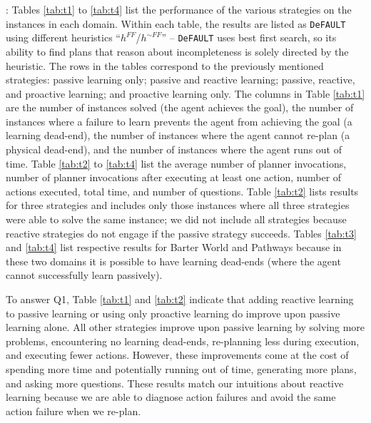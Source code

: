 \documentclass[letterpaper]{article}
\def\und#1{\noindent{\bf #1}:}
\def\FFRISKY{{\tt DeFAULT}}
\begin{document}
\und{Results} Tables \ref{tab:t1} to \ref{tab:t4} list the performance of the
various strategies on the instances in each domain.  Within each table, the
results are listed as \FFRISKY{} using different heuristics
``$h^{FF}$/$h^{\sim FF}$'' -- \FFRISKY{} uses best first search, so its
ability to find plans that reason about incompleteness is solely directed by the
heuristic. The rows in the tables correspond to the previously mentioned
strategies: passive learning only; passive and reactive learning;  passive, reactive, and proactive learning; and proactive learning only.  The columns in Table
\ref{tab:t1} are the number of instances solved (the agent achieves the goal),
the number of instances where a failure to learn prevents the agent from
achieving the goal (a learning dead-end), the number of instances where the
agent cannot re-plan (a physical dead-end), and the number of instances where
the agent runs out of time.  Table \ref{tab:t2} to \ref{tab:t4} list the average
number of planner invocations, number of planner invocations after executing at
least one action, number of actions executed, total time, and number of
questions.  Table \ref{tab:t2} lists results for three strategies and includes
only those instances where all three strategies were able to solve the same
instance; we did not include all strategies because reactive strategies do not
engage if the passive strategy succeeds. Tables \ref{tab:t3} and \ref{tab:t4}
list respective results for Barter World and Pathways because in these two domains it is possible to have learning dead-ends (where the agent cannot successfully learn passively).



To answer Q1, Table \ref{tab:t1} and \ref{tab:t2} indicate that adding reactive
learning to passive learning or using only proactive learning do improve upon
passive learning alone.  All other strategies improve upon passive learning by
solving more problems, encountering no learning dead-ends, re-planning less during
execution, and executing fewer actions.  However, these improvements come at the
cost of spending more time and potentially running out of time, generating more
plans, and asking more questions.  These results match our intuitions about
reactive learning because we are able to diagnose action failures and avoid the
same action failure when we re-plan.

\end{document}
